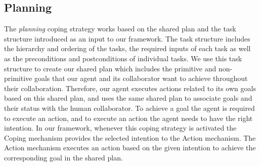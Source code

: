 \documentclass[12pt]{report}
\begin{document}
\subsection{Planning}
The \textit{planning} coping strategy works based on the shared plan and the
task structure introduced as an input to our framework. The task structure
includes the hierarchy and ordering of the tasks, the required inputs of
each task as well as the preconditions and postconditions of individual tasks.
We use this task structure to create our shared plan which includes the
primitive and non-primitive goals that our agent and its collaborator want to
achieve throughout their collaboration. Therefore, our agent executes actions
related to its own goals based on this shared plan, and uses the same shared
plan to associate goals and their status with the human collaborator. To achieve
a goal the agent is required to execute an action, and to execute an action the
agent needs to have the right intention. In our framework, whenever this coping
strategy is activated the Coping mechanism provides the selected intention to
the Action mechanism. The Action mechanism executes an action based on the given
intention to achieve the corresponding goal in the shared plan.
\end{document}
